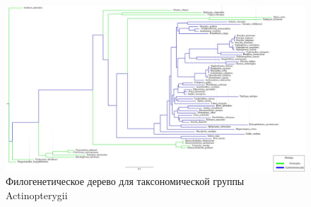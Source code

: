 \begin{figure}[h] %
    \centering
    \includegraphics[width=1.0\textwidth]{images/Actinopterygii_tree}
    \caption{Филогенетическое дерево для таксономической группы Actinopterygii}
    \label{fig:Actinopterygii_tree}
\end{figure}
